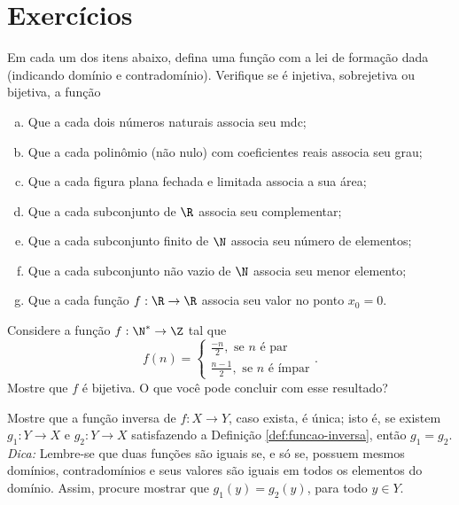 \section{Exercícios}

\begin{exercise}
Em cada um dos itens abaixo, defina uma função com a lei de
formação dada (indicando domínio e contradomínio). Verifique se é
injetiva, sobrejetiva ou bijetiva, a função
\begin{enumerate}[(a)]
  \item Que a cada dois números naturais associa seu mdc;
  \item Que a cada polinômio (não nulo) com coeficientes reais
  associa seu grau;
  \item Que a cada figura plana fechada e limitada associa a sua
  área;
  \item Que a cada subconjunto de $\R$ associa seu complementar;
  \item Que a cada subconjunto finito de $\N$ associa seu número de
  elementos;
  \item Que a cada subconjunto não vazio de $\N$ associa seu menor
  elemento;
  \item Que a cada função $f: \R \to \R$ associa seu valor no ponto
  $x_0 = 0$.
\end{enumerate}
\end{exercise}

\begin{exercise}
Considere a  função $f:  \N^*  \to      \Z $ tal que $$f(n) =
\begin{cases} \frac {-n} 2, \text{ se $n$ é par} \\ \frac {n-1} 2, \text{ se $n$ é
ímpar} \end{cases}.$$ Mostre que $f$ é bijetiva. O que você pode
concluir com esse resultado?
\end{exercise}

\begin{exercise}
Mostre que a função inversa de $f: X \to Y$, caso exista, é
única; isto é, se existem $g_1 : Y \to X$ e $g_2 : Y \to X$
satisfazendo a Definição \ref{def:funcao-inversa}, então $g_1 = g_2$.\\
\emph{Dica: } Lembre-se que duas funções são iguais se, e só se,
possuem mesmos domínios, contradomínios e seus valores são iguais em
todos os elementos do domínio. Assim, procure mostrar que $g_1 (y) =
g_2 (y)$, para todo $y \in Y$.
\end{exercise}


